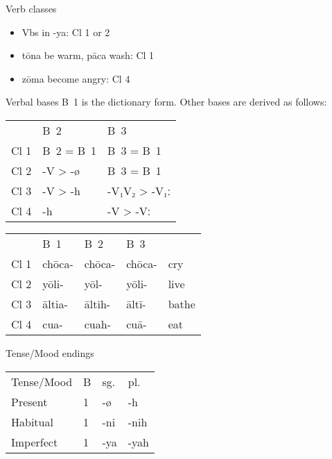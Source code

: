 \documentclass[12pt]{beamer}
\newcommand{\nah}[1]{\textcolor{nahgrn}{#1}}
\newcommand{\trs}[1]{\textcolor{nahblu}{#1}}
\begin{document}
\begin{frame}
\begin{columns}[t]
\begin{column}{.18\linewidth}
\begin{block}{Verb classes}
\begin{itemize}
          \item Vbs in \nah{-ya}: Cl 1 or 2
          \item \nah{tōna} \trs{be warm}, \nah{pāca} \trs{wash}: Cl 1
          \item \nah{zōma} \trs{become angry}: Cl 4
        \end{itemize}
      \end{block}
      \begin{block}{Verbal bases}
        B~1 is the dictionary form. Other bases are derived as follows:
        \begin{tabular}{lll}
               & B~2           & B~3                \\
          Cl 1 & B~2 = B~1     & B~3 = B~1          \\
          Cl 2 & \nah{-V > -ø} & B~3 = B~1          \\
          Cl 3 & \nah{-V > -h} & \nah{-V₁V₂ > -V₁ː} \\
          Cl 4 & \nah{-h}      & \nah{-V > -Vː}
        \end{tabular}
      \end{block}
      \begin{example}
        \begin{tabular}{lllll}
               & B~1          & B~2          & B~3          &             \\
          Cl 1 & \nah{chōca-} & \nah{chōca-} & \nah{chōca-} & \trs{cry}   \\
          Cl 2 & \nah{yōli-}  & \nah{yōl-}   & \nah{yōli-}  & \trs{live}  \\
          Cl 3 & \nah{āltia-} & \nah{āltih-} & \nah{āltī-}  & \trs{bathe} \\
          Cl 4 & \nah{cua-}   & \nah{cuah-}  & \nah{cuā-}   & \trs{eat}
        \end{tabular}
      \end{example}
      \begin{block}{Tense/Mood endings}
        \begin{threeparttable}
          \begin{tabular}{llll}
            Tense/Mood  & B & sg.                & pl.                    \\
            Present     & 1 & \nah{-ø}           & \nah{-h}               \\
            Habitual    & 1 & \nah{-ni}\tnote{1} & \nah{-nih}\tnote{1}    \\
            Imperfect   & 1 & \nah{-ya}\tnote{2} & \nah{-yah}             \\

\end{tabular}
\end{threeparttable}
\end{block}
\end{column}
\end{columns}
\end{frame}
\end{document}
